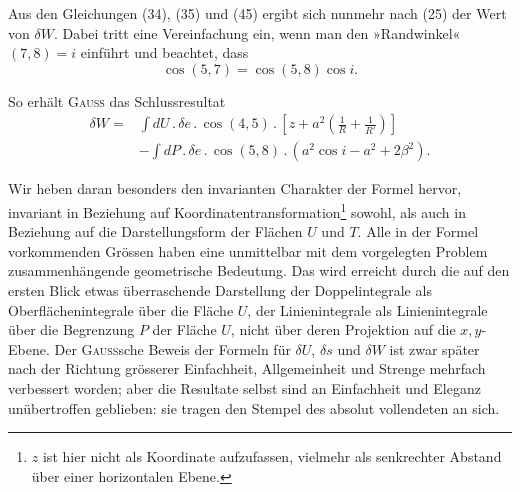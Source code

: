 Aus den Gleichungen (34), (35) und (45) ergibt sich nunmehr nach (25)
der Wert von $\delta W$. Dabei tritt eine Vereinfachung ein, wenn man den »Randwinkel«
$(7,8)=i$ einführt und beachtet, dass
\begin{equation*}
\cos(5,7)=\cos(5,8)\cos i.\tag{46}
\end{equation*}

So erhält \textsc{Gauss} das Schlussresultat
\begin{equation*}
\begin{aligned}
\delta W={}&\int dU\mathbin{.}\delta e\mathbin{.}\cos(4,5)\mathbin{.}\left[z+a^2\left(\frac{1}{R}+\frac{1}{R'}\right)\right]\\
&-\int dP\mathbin{.}\delta e\mathbin{.}\cos(5,8)\mathbin{.}(a^2\cos i-a^2+2\beta^2).
\end{aligned}\tag{47}
\end{equation*}

Wir heben daran besonders den invarianten Charakter der Formel hervor,
invariant in Beziehung auf Koordinatentransformation\footnote{$z$ ist hier nicht als Koordinate aufzufassen, vielmehr als senkrechter Abstand über einer horizontalen
Ebene.} sowohl, als auch in
Beziehung auf die Darstellungsform der Flächen $U$ und $T$. Alle in der Formel
vorkommenden Grössen haben eine unmittelbar mit dem vorgelegten
Problem zusammenhängende geometrische Bedeutung. Das wird erreicht durch
die auf den ersten Blick etwas überraschende Darstellung der Doppelintegrale
als Oberflächenintegrale über die Fläche $U$, der Linienintegrale als Linienintegrale
über die Begrenzung $P$ der Fläche $U$, nicht über deren Projektion
auf die $x,y$-Ebene. Der \textsc{Gauss}sche Beweis der Formeln für $\delta U$, $\delta s$ und $\delta W$
\clearpage{}
\noindent ist zwar später nach der Richtung grösserer Einfachheit, Allgemeinheit und
Strenge mehrfach verbessert worden; aber die Resultate selbst sind an Einfachheit
und Eleganz unübertroffen geblieben: sie tragen den Stempel des absolut
vollendeten an sich.
\par\clearpage\endgroup
